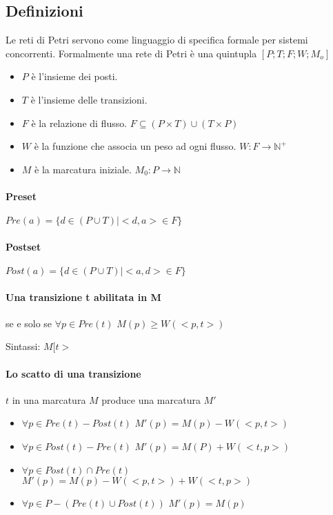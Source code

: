 \documentclass[12pt, twoside, letterpaper]{article}
\begin{document}
		\subsection{Definizioni}
			Le reti di Petri servono come linguaggio di specifica formale per sistemi concorrenti. Formalmente una rete di Petri è una quintupla $[P;T;F;W;M_{o}]$
			\begin{itemize}
				\item $P$ è l'insieme dei posti.
				\item $T$ è l'insieme delle transizioni.
				\item $F$ è la relazione di flusso. $F \subseteq (P \times T) \cup (T \times P) $
				\item $W$ è la funzione che associa un peso ad ogni flusso. $W: F \rightarrow \mathbb{N}^+$
				\item $M$ è la marcatura iniziale. $M_{0}: P \rightarrow \mathbb{N}$
			\end{itemize}
			\paragraph{Preset} $Pre(a) = \{d \in (P \cup T) | <d,a> \in F\}$
			\paragraph{Postset} $Post(a) = \{d \in (P \cup T) | <a,d> \in F \} $
			\paragraph{Una transizione t abilitata in M} se e solo se $\forall p \in Pre(t)$ $M(p) \geq W(<p,t>)$
			
			Sintassi: $M[t>$
			\paragraph{Lo scatto di una transizione}$t$ in una marcatura $M$ produce una marcatura $M'$
			\begin{itemize}
				\item $\forall p \in Pre(t) - Post(t)$ \qquad $M'(p) = M(p) - W(<p,t>)$
				\item $\forall p \in Post(t) - Pre(t)$ \qquad $M'(p) = M(P) + W(<t,p>)$ 
				\item $\forall p \in Post(t) \cap Pre(t)$ \qquad $M'(p)=M(p) - W(<p,t>) + W(<t,p>)$
				\item $\forall p \in P -(Pre(t) \cup Post(t))$ \qquad $M'(p) = M(p)$
			\end{itemize}
		
\end{document}
